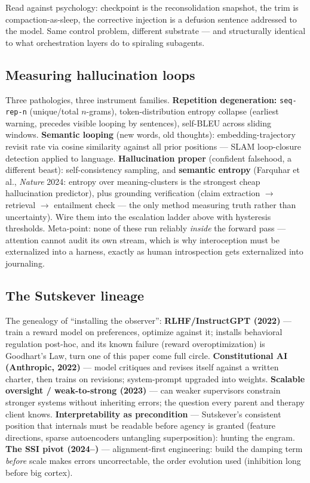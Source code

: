 \documentclass[11pt]{article}
\begin{document}
Read against psychology: checkpoint is the reconsolidation snapshot, the trim is compaction-as-sleep, the corrective injection is a defusion sentence addressed to the model. Same control problem, different substrate --- and structurally identical to what orchestration layers do to spiraling subagents.

\subsection{Measuring hallucination loops}

Three pathologies, three instrument families. \textbf{Repetition degeneration:} \texttt{seq-rep-n} (unique/total $n$-grams), token-distribution entropy collapse (earliest warning, precedes visible looping by sentences), self-BLEU across sliding windows. \textbf{Semantic looping} (new words, old thoughts): embedding-trajectory revisit rate via cosine similarity against all prior positions --- SLAM loop-closure detection applied to language. \textbf{Hallucination proper} (confident falsehood, a different beast): self-consistency sampling, and \textbf{semantic entropy} (Farquhar et al., \textit{Nature} 2024: entropy over meaning-clusters is the strongest cheap hallucination predictor), plus grounding verification (claim extraction $\to$ retrieval $\to$ entailment check --- the only method measuring truth rather than uncertainty). Wire them into the escalation ladder above with hysteresis thresholds. Meta-point: none of these run reliably \emph{inside} the forward pass --- attention cannot audit its own stream, which is why interoception must be externalized into a harness, exactly as human introspection gets externalized into journaling.

\subsection{The Sutskever lineage}

The genealogy of ``installing the observer'': \textbf{RLHF/InstructGPT (2022)} --- train a reward model on preferences, optimize against it; installs behavioral regulation post-hoc, and its known failure (reward overoptimization) is Goodhart's Law, turn one of this paper come full circle. \textbf{Constitutional AI (Anthropic, 2022)} --- model critiques and revises itself against a written charter, then trains on revisions; system-prompt upgraded into weights. \textbf{Scalable oversight / weak-to-strong (2023)} --- can weaker supervisors constrain stronger systems without inheriting errors; the question every parent and therapy client knows. \textbf{Interpretability as precondition} --- Sutskever's consistent position that internals must be readable before agency is granted (feature directions, sparse autoencoders untangling superposition): hunting the engram. \textbf{The SSI pivot (2024--)} --- alignment-first engineering: build the damping term \emph{before} scale makes errors uncorrectable, the order evolution used (inhibition long before big cortex).
\end{document}
